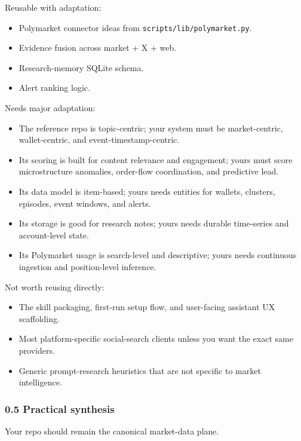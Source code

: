 \documentclass[
]{article}
\providecommand{\tightlist}{%
  \setlength{\itemsep}{0pt}\setlength{\parskip}{0pt}}
\begin{document}
Reusable with adaptation:

\begin{itemize}
\tightlist
\item
  Polymarket connector ideas from \texttt{scripts/lib/polymarket.py}.
\item
  Evidence fusion across market + X + web.
\item
  Research-memory SQLite schema.
\item
  Alert ranking logic.
\end{itemize}

Needs major adaptation:

\begin{itemize}
\tightlist
\item
  The reference repo is topic-centric; your system must be
  market-centric, wallet-centric, and event-timestamp-centric.
\item
  Its scoring is built for content relevance and engagement; yours must
  score microstructure anomalies, order-flow coordination, and
  predictive lead.
\item
  Its data model is item-based; yours needs entities for wallets,
  clusters, episodes, event windows, and alerts.
\item
  Its storage is good for research notes; yours needs durable
  time-series and account-level state.
\item
  Its Polymarket usage is search-level and descriptive; yours needs
  continuous ingestion and position-level inference.
\end{itemize}

Not worth reusing directly:

\begin{itemize}
\tightlist
\item
  The skill packaging, first-run setup flow, and user-facing assistant
  UX scaffolding.
\item
  Most platform-specific social-search clients unless you want the exact
  same providers.
\item
  Generic prompt-research heuristics that are not specific to market
  intelligence.
\end{itemize}

\subsubsection{0.5 Practical synthesis}\label{05-practical-synthesis}

Your repo should remain the canonical market-data plane.
\end{document}
